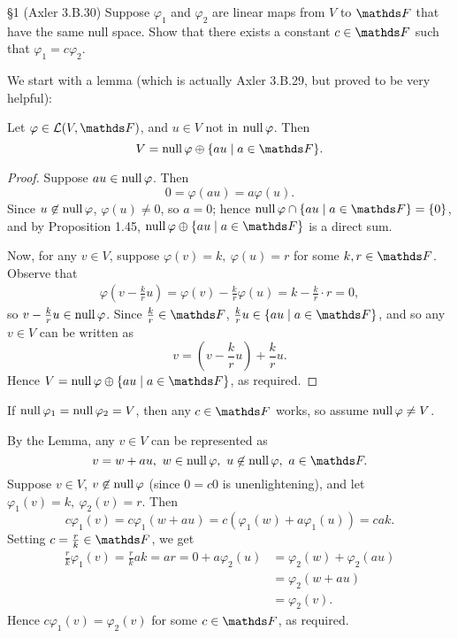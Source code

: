\documentclass{homework}
\begin{document}
\begin{problem}{\S 1}
  (Axler 3.B.30) Suppose $\varphi_1$ and $\varphi_2$ are linear maps from $V$ to $\F$ that have the same
  null space. Show that there exists a constant $c\in \F$ such that $\varphi_1=c\varphi_2$.
\end{problem}
\begin{solution}  
We start with a lemma (which is actually Axler 3.B.29, but proved to be very helpful):
\begin{lemma}[]{}
  Let $\varphi\in \mc{L}(V,\F)$, and $u\in V$ not in $\operatorname{null}\varphi$. Then \[
    V = \Null\varphi \oplus \{au\mid a\in \F\} 
  .\] 
\end{lemma}
\begin{proof}[Proof]
  Suppose $au\in \operatorname{null}\varphi$. Then \[
    0=\varphi(au)=a\varphi(u)
  .\] Since $u\not\in \operatorname{null}\varphi$, $\varphi(u)\neq 0$, so $a=0$; hence $\Null\varphi\cap \{au\mid
  a\in \F\} =\{ 0 \}$, and by Proposition 1.45, $ \Null\varphi \oplus \{au\mid a\in \F\}$ is a
  direct sum.

  Now, for any $v\in V$, suppose $\varphi(v)=k,\ \varphi(u)=r$ for some $k,r\in \F$. Observe that
  \begin{align*}
    \varphi(v-\frac{k}{r}u)=\varphi(v)-\frac{k}{r}\varphi(u)=k-\frac{k}{r}\cdot r=0
  ,\end{align*} so $v-\frac{k}{r}u\in \operatorname{null}\varphi$. Since $\frac{k}{r}\in \F$, $\frac{k}{r}u\in
  \{au\mid a\in \F\}$, and so any $v\in V$ can be written as \[
    v = (v-\frac{k}{r}u)+\frac{k}{r}u
  .\] Hence $V=\Null\varphi\oplus \{au\mid a\in \F\} $, as required.
\end{proof}

If $\operatorname{null}\varphi_1=\operatorname{null}\varphi_2=V$, then any $c\in \F$ works, so assume $ \operatorname{null}\varphi\neq V$.

By the Lemma, any $v\in V$ can be represented as \[
  v=w+au,\ w\in \Null\varphi,\ u\not\in \Null\varphi,\ a\in \F
.\] Suppose $v\in V$, $v\not\in \operatorname{null}\varphi$ (since $0=c0$ is unenlightening), and let
$\varphi_1(v)=k,\ \varphi_2(v)=r$. Then \[
  c\varphi_1(v)=c\varphi_1(w+au)=c(\varphi_1(w)+a\varphi_1(u))=cak
.\] Setting $c=\frac{r}{k}\in \F$, we get 
\begin{align*}
  \frac{r}{k}\varphi_1(v)=\frac{r}{k}ak=ar=0+a\varphi_2(u)&= \varphi_2(w)+\varphi_2(au) \\
                                                          &= \varphi_2(w+au)\\
                                                          &= \varphi_2(v)
.\end{align*}
Hence $c\varphi_1(v)=\varphi_2(v)$ for some $c\in \F$, as required.
\end{solution}
\end{document}
